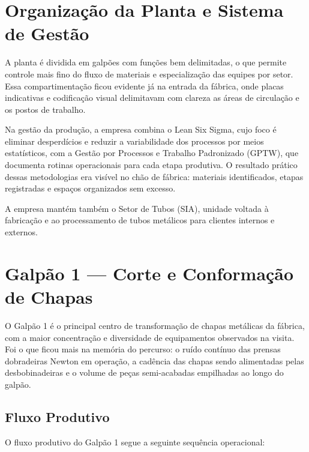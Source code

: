 \documentclass[12pt,a4paper,oneside,brazil,chapter=TITLE]{article}
\newcommand{\secbreak}{\clearpage}
\let\oldsection\section
\renewcommand{\section}{\secbreak\oldsection}
\begin{document}
\section{Organização da Planta e Sistema de Gestão}

A planta é dividida em galpões com funções bem delimitadas, o que permite controle mais fino do fluxo de materiais e especialização das equipes por setor. Essa compartimentação ficou evidente já na entrada da fábrica, onde placas indicativas e codificação visual delimitavam com clareza as áreas de circulação e os postos de trabalho.

Na gestão da produção, a empresa combina o Lean Six Sigma, cujo foco é eliminar desperdícios e reduzir a variabilidade dos processos por meios estatísticos, com a Gestão por Processos e Trabalho Padronizado (GPTW), que documenta rotinas operacionais para cada etapa produtiva. O resultado prático dessas metodologias era visível no chão de fábrica: materiais identificados, etapas registradas e espaços organizados sem excesso.

A empresa mantém também o Setor de Tubos (SIA), unidade voltada à fabricação e ao processamento de tubos metálicos para clientes internos e externos.

\section{Galpão 1 --- Corte e Conformação de Chapas}

O Galpão 1 é o principal centro de transformação de chapas metálicas da fábrica, com a maior concentração e diversidade de equipamentos observados na visita. Foi o que ficou mais na memória do percurso: o ruído contínuo das prensas dobradeiras Newton em operação, a cadência das chapas sendo alimentadas pelas desbobinadeiras e o volume de peças semi-acabadas empilhadas ao longo do galpão.

\subsection{Fluxo Produtivo}

O fluxo produtivo do Galpão 1 segue a seguinte sequência operacional:
\end{document}
